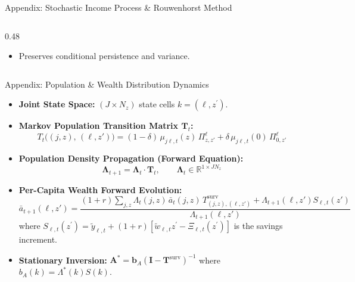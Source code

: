 \documentclass[aspectratio=169, 10pt]{beamer}
\begin{document}
\begin{frame}{Appendix: Stochastic Income Process \& Rouwenhorst Method \hfill \hyperlink{main:preferences}{\scriptsize{}}}
\begin{columns}[T]
\begin{column}{0.48\textwidth}
\begin{itemize}
{\begin{align*}
                \end{align*}
                }
                with $p = q = \frac{1+\rho}{2} = 0.967$.
                \item Preserves conditional persistence and variance.
            \end{itemize}
        \end{column}
    \end{columns}
\end{frame}

\begin{frame}{Appendix: Population \& Wealth Distribution Dynamics \hfill \hyperlink{main:agg_dynamics}{\scriptsize{}}}\label{backup:distribution_dynamics}
    \begin{itemize}\small\setlength{\itemsep}{3pt}
        \item \textbf{Joint State Space:} $(J \times N_z)$ state cells $k = (\ell, z^\prime)$.
        \item \textbf{Markov Population Transition Matrix $\mathbf{T}_t$:}
        $$T_t\bigl((j,z),\,(\ell,z')\bigr) = (1-\delta)\,\mu_{j\ell,t}(z)\,\Pi^\ell_{z,z'} + \delta\,\mu_{j\ell,t}(0)\,\Pi^\ell_{0,z'}$$
        \item \textbf{Population Density Propagation (Forward Equation):}
        $$\boldsymbol{\Lambda}_{t+1} = \boldsymbol{\Lambda}_t \cdot \mathbf{T}_t, \qquad \boldsymbol{\Lambda}_t \in \mathbb{R}^{1 \times JN_z}$$
        \item \textbf{Per-Capita Wealth Forward Evolution:}
        $$\bar{a}_{t+1}(\ell,z') = \frac{(1+r)\sum_{j,z}\Lambda_t(j,z)\,\bar a_t(j,z)\,T^{\mathrm{surv}}_{(j,z),(\ell,z')} + \Lambda_{t+1}(\ell,z') S_{\ell,t}(z')}{\Lambda_{t+1}(\ell,z')}$$
        where $S_{\ell,t}(z^\prime) = \tilde{y}_{\ell,t} + (1+r)[\tilde{w}_{\ell,t}z^\prime - \Xi_{\ell,t}(z^\prime)]$ is the savings increment.
        \item \textbf{Stationary Inversion:} $\mathbf{A}^* = \boldsymbol{b}_A (\mathbf{I} - \mathbf{T}^{\text{surv}})^{-1}$ where $b_A(k) = \Lambda^*(k) S(k)$.
    \end{itemize}
\end{frame}
\end{document}
